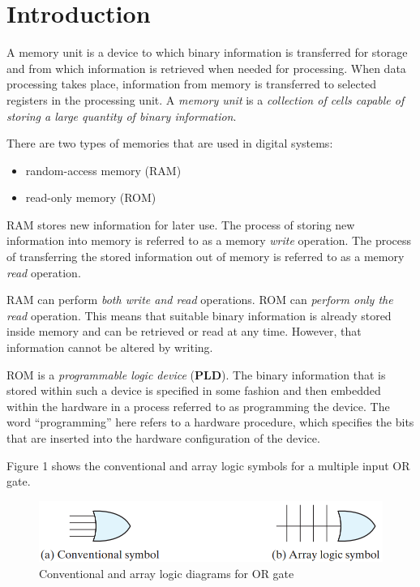 \section{Introduction}
\label{sec:introduction}

A memory unit is a device to which binary information is transferred for storage and from which information is retrieved when needed for processing. When data processing takes place, information from memory is transferred to selected registers in the processing unit. A \textit{memory unit} is a \textit{collection of cells capable of storing a large quantity of binary information}.

There are two types of memories that are used in digital systems: 
\begin{itemize}
  \item random-access memory (RAM)
  \item read-only memory (ROM)
\end{itemize}
\noindent RAM stores new information for later use. The process of storing new information into memory is referred to as a memory \textit{write} operation. The process of transferring the stored information out of memory is referred to as a memory \textit{read} operation.

RAM can perform \textit{both write and read} operations. ROM can \textit{perform only the read} operation. This means that suitable binary information is already stored inside memory and can be retrieved or read at any time. However, that information cannot be altered by writing.

ROM is a \textit{programmable logic device} (\textbf{PLD}). The binary information that is stored within such a device is specified in some fashion and then embedded within the hardware in a process referred to as programming the device. The word ``programming'' here refers to a hardware procedure, which specifies the bits that are inserted into the hardware configuration of the device.

Figure 1 shows the conventional and array logic symbols for a multiple input OR gate.
\begin{figure}[H]
  \centering
  \includegraphics[width=\linewidth]{img/fig-7.1.png}
  \caption{Conventional and array logic diagrams for OR gate}
  \label{fig:7.1}
\end{figure}
